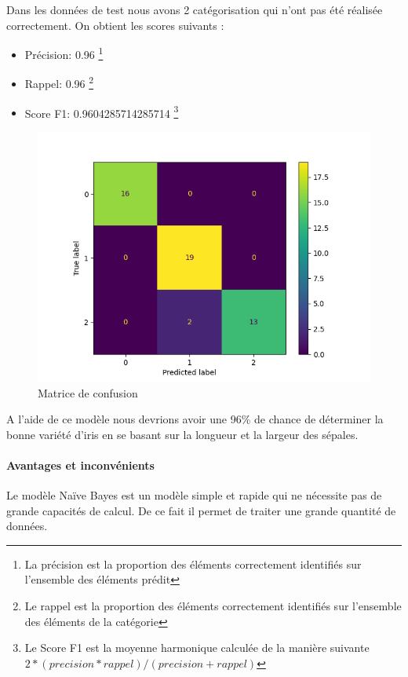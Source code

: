 \documentclass[a4paper,12pt]{article}
\begin{document}
				Dans les données de test nous avons 2 catégorisation qui n'ont pas été réalisée correctement. On obtient les scores suivants :
				\begin{itemize}
					\item Précision: 0.96                    \footnote{La précision est la proportion des éléments correctement identifiés sur l'ensemble des éléments prédit}
					\item Rappel: 0.96						\footnote{Le rappel est la proportion des éléments correctement identifiés sur l'ensemble des éléments de la catégorie}
					\item Score F1: 0.9604285714285714		\footnote{Le Score F1 est la moyenne harmonique calculée de la manière suivante $2*(precision*rappel)/(precision+rappel)$}
				\end{itemize}				
				
				\begin{figure}[H]
					\centering
					\includegraphics[scale=0.7]{img/NBmatrix.png}
					\caption{Matrice de confusion}
				\end{figure}
				
				A l'aide de ce modèle nous devrions avoir une 96\% de chance de déterminer la bonne variété d'iris en se basant sur la longueur et la largeur des sépales.  
				
			\paragraph{Avantages et inconvénients} 
				Le modèle Naïve Bayes est un modèle simple et rapide qui ne nécessite pas de grande capacités de calcul. De ce fait il permet de traiter une grande quantité de données.\\
				
\end{document}
